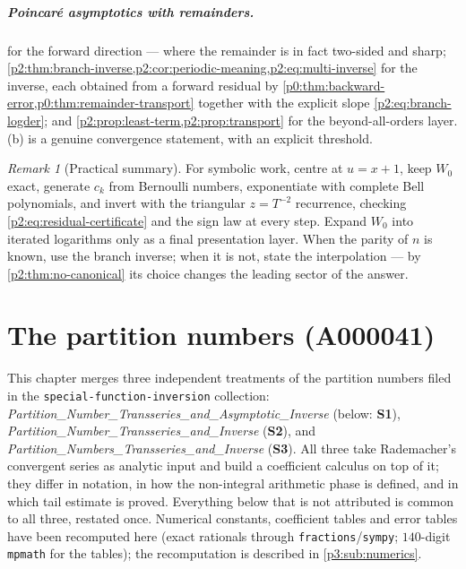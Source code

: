 \documentclass[11pt,a4paper,oneside]{book}
\theoremstyle{plain}
\theoremstyle{definition}
\theoremstyle{remark}
\newtheorem{remark}[theorem]{Remark}
\newcommand{\Wlam}{W}
\begin{document}
\paragraph{Poincar\'e asymptotics with remainders.}
 for the forward
direction --- where the remainder is in fact two-sided and sharp;
\cref{p2:thm:branch-inverse,p2:cor:periodic-meaning,p2:eq:multi-inverse} for
the inverse, each obtained from a forward residual by
\cref{p0:thm:backward-error,p0:thm:remainder-transport} together with the
explicit slope \cref{p2:eq:branch-logder}; and
\cref{p2:prop:least-term,p2:prop:transport} for the beyond-all-orders layer.
(b) is a genuine convergence statement, with an explicit
threshold.

\begin{remark}[Practical summary]
\label{p2:rem:summary}
For symbolic work, centre at \(u=x+1\), keep \(\Wlam_0\) exact, generate
\(c_k\) from Bernoulli numbers, exponentiate with complete Bell polynomials,
and invert with the triangular \(z=T^{-2}\) recurrence, checking
\cref{p2:eq:residual-certificate} and the sign law at every step.  Expand
\(\Wlam_0\) into iterated logarithms only as a final presentation layer.  When
the parity of \(n\) is known, use the branch inverse; when it is not, state the
interpolation --- by \cref{p2:thm:no-canonical} its choice changes the leading
sector of the answer.
\end{remark}

\chapter{The partition numbers (A000041)}\label{p3:sec:top}

\begin{sourcebox}
This chapter merges three independent treatments of the partition numbers filed in the
\texttt{special-function-inversion} collection:
\emph{Partition\_Number\_Transseries\_and\_Asymptotic\_Inverse} (below: \textbf{S1}),
\emph{Partition\_Number\_Transseries\_and\_Inverse} (\textbf{S2}), and
\emph{Partition\_Numbers\_Transseries\_and\_Inverse} (\textbf{S3}). All three take Rademacher's
convergent series as analytic input and build a coefficient calculus on top of it; they differ in
notation, in how the non-integral arithmetic phase is defined, and in which tail estimate is
proved. Everything below that is not attributed is common to all three, restated once. Numerical
constants, coefficient tables and error tables have been recomputed here (exact rationals through
\texttt{fractions}/\texttt{sympy}; $140$-digit \texttt{mpmath} for the tables); the recomputation
is described in \cref{p3:sub:numerics}.
\end{sourcebox}
\end{document}
